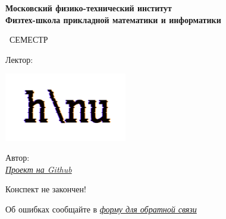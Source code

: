 \begin{titlepage}
	\clearpage\thispagestyle{empty}
	\centering
	
	\textbf{Московский физико-технический институт \\ Физтех-школа прикладной математики и информатики}
	\vspace{33ex}
	
	{\textbf{\FullCourseNameFirstPart}}
	
	\SemesterNumber\ СЕМЕСТР  
	\vspace{1ex}
	
	Лектор: \textit{\LecturerInitials}
	
	\includegraphics[width=0.4\textwidth]{images/logo_ltc.png}

	\begin{flushright}
		\noindent
		Автор: \href{\VKLink}{\textit{\AuthorInitials}}
		\\
		\href{\GithubLink}{\textit{Проект на Github}}
	\end{flushright}

	\begin{center}
		\LARGE
		Конспект не закончен!
		
		Об ошибках сообщайте в \href{https://docs.google.com/forms/d/e/1FAIpQLSfgLZoO_ntFnJ3vC7keF3C0EF9anRhFk1NsUm8Gjuj_7s-ZHw/viewform}{\textit{форму для обратной связи}}
	\end{center}
	
	\vfill
	\CourseDate
	\pagebreak
\end{titlepage}
